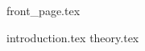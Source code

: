 \documentclass{report}
\numberwithin{equation}{section}
\begin{document}
{front_page.tex}

\tableofcontents
\newpage

\pagestyle{fancy}

{introduction.tex}
{theory.tex}

\newpage


{}
\end{document}
